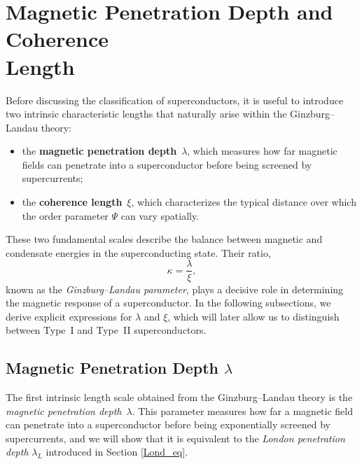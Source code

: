 
\section{Magnetic Penetration Depth and Coherence \\Length}

Before discussing the classification of superconductors, it is useful to introduce
two intrinsic characteristic lengths that naturally arise within the
Ginzburg–Landau theory:
\begin{itemize}
    \item the \textbf{magnetic penetration depth}~$\lambda$, which measures how far
    magnetic fields can penetrate into a superconductor before being screened by
    supercurrents;
    \item the \textbf{coherence length}~$\xi$, which characterizes the typical
    distance over which the order parameter $\Psi$ can vary spatially.
\end{itemize}
These two fundamental scales describe the balance between magnetic and
condensate energies in the superconducting state.  
Their ratio,
\begin{equation}
\kappa = \frac{\lambda}{\xi},
\end{equation}
known as the \textit{Ginzburg--Landau parameter}, plays a decisive role in determining
the magnetic response of a superconductor.  
In the following subsections, we derive explicit expressions for $\lambda$ and $\xi$,
which will later allow us to distinguish between Type~I and Type~II superconductors.


\subsection*{Magnetic Penetration Depth $\lambda$}
\label{sec:penetration_depth}

The first intrinsic length scale obtained from the Ginzburg–Landau theory is the
\textit{magnetic penetration depth}~$\lambda$. This parameter measures how far a magnetic field can penetrate into a superconductor before being exponentially screened by supercurrents, and we will show that it is equivalent to the \textit{London penetration depth} $\lambda_L$ introduced in Section \ref{Lond_eq}.

